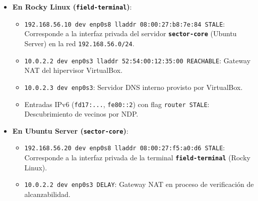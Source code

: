 \documentclass[11pt,a4paper]{article}
\begin{document}
\begin{itemize}[leftmargin=*]
    \item \textbf{En Rocky Linux (\texttt{field-terminal})}:
    \begin{itemize}
        \item \texttt{192.168.56.10 dev enp0s8 lladdr 08:00:27:b8:7e:84 STALE}: Corresponde a la interfaz privada del servidor \textbf{\texttt{sector-core}} (Ubuntu Server) en la red \texttt{192.168.56.0/24}.
        \item \texttt{10.0.2.2 dev enp0s3 lladdr 52:54:00:12:35:00 REACHABLE}: Gateway NAT del hipervisor VirtualBox.
        \item \texttt{10.0.2.3 dev enp0s3}: Servidor DNS interno provisto por VirtualBox.
        \item Entradas IPv6 (\texttt{fd17:...}, \texttt{fe80::2}) con flag \texttt{router STALE}: Descubrimiento de vecinos por NDP.
    \end{itemize}
    \item \textbf{En Ubuntu Server (\texttt{sector-core})}:
    \begin{itemize}
        \item \texttt{192.168.56.20 dev enp0s8 lladdr 08:00:27:f5:a0:d6 STALE}: Corresponde a la interfaz privada de la terminal \textbf{\texttt{field-terminal}} (Rocky Linux).
        \item \texttt{10.0.2.2 dev enp0s3 DELAY}: Gateway NAT en proceso de verificación de alcanzabilidad.
    \end{itemize}
\end{itemize}
\end{document}
